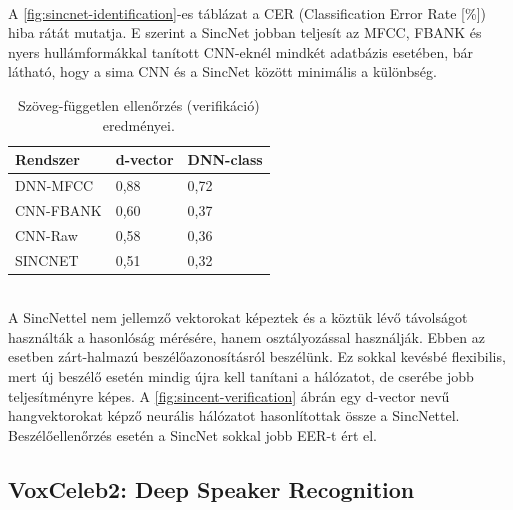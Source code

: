 \ \\
A \ref{fig:sincnet-identification}-es táblázat a CER (Classification Error Rate [\%]) hiba rátát mutatja. E szerint a SincNet jobban teljesít az MFCC, FBANK és nyers hullámformákkal tanított CNN-eknél mindkét adatbázis esetében, bár látható, hogy a sima CNN és a SincNet között minimális a különbség.
\newline
\begin{table}[!ht]
	\begin{tabular}{*3l} \toprule
		\bfseries Rendszer & \bfseries d-vector & \bfseries DNN-class \\ \midrule
		DNN-MFCC & 0,88 & 0,72 \\
		\rowcolor{gray!10} 
		CNN-FBANK & 0,60 & 0,37 \\
		CNN-Raw  & 0,58 & 0,36 \\
		\rowcolor{gray!10} 
		SINCNET & 0,51 & 0,32 \\
		\bottomrule
		\hline
	\end{tabular}
	\centering
	\caption{Szöveg-független ellenőrzés (verifikáció) eredményei.}
	\label{fig:sincnet-verification}
\end{table}
\ \\
\newline
A SincNettel nem jellemző vektorokat képeztek és a köztük lévő távolságot használták a hasonlóság mérésére, hanem osztályozással használják. Ebben az esetben zárt-halmazú beszélőazonosításról beszélünk. Ez sokkal kevésbé flexibilis, mert új beszélő esetén mindig újra kell tanítani a hálózatot, de cserébe jobb teljesítményre képes. A \ref{fig:sincent-verification} ábrán egy d-vector nevű hangvektorokat képző neurális hálózatot hasonlítottak össze a SincNettel. Beszélőellenőrzés esetén a SincNet sokkal jobb EER-t ért el.
\newpage
\subsection{VoxCeleb2: Deep Speaker Recognition}

